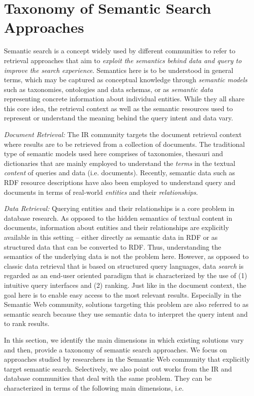 \section{Taxonomy of Semantic Search Approaches}
Semantic search is a concept widely used by different communities to refer to retrieval approaches that aim to \emph{exploit the semantics behind data and query to improve the search experience}. Semantics here is to be understood in general terms, which may be captured as conceptual knowledge through \emph{semantic models} such as taxonomies, ontologies and data schemas, or as \emph{semantic data} representing concrete information about individual entities. While they all share this core idea, the retrieval context as well as the semantic resources used to represent or understand the meaning behind the query intent and data vary. 

\emph{Document Retrieval:} The IR community targets the document retrieval context where results are to be retrieved from a collection of documents. The traditional type of semantic models used here comprises of taxonomies, thesauri and dictionaries that are mainly employed to understand the \emph{terms} in the textual \emph{content} of queries and data (i.e. documents). Recently, semantic data such as RDF resource descriptions have also been employed to understand query and documents in terms of real-world \emph{entities} and their \emph{relationships}. 

\emph{Data Retrieval:} Querying entities and their relationships is a core problem in database research. As opposed to the hidden semantics of textual content in documents, information about entities and their relationships are explicitly available in this setting -- either directly as semantic data in RDF or as structured data that can be converted to RDF. Thus, understanding the semantics of the underlying data is not the problem here. However, as opposed to classic data retrieval that is based on structured query languages, data \emph{search} is regarded as an end-user oriented paradigm that is characterized by the use of (1) intuitive query interfaces and (2) ranking. Just like in the document context, the goal here is to enable easy access to the most relevant results. Especially in the Semantic Web community, solutions targeting this problem are also referred to as semantic search because they use semantic data to interpret the query intent and to rank results. 

In this section, we identify the main dimensions in which existing solutions vary and then, provide a taxonomy of semantic search approaches. We focus on approaches studied by researchers in the Semantic Web community that explicitly target semantic search. Selectively, we also point out works from the IR and database communities that deal with the same problem. 
They can be characterized in terms of the following main dimensions, i.e. 

